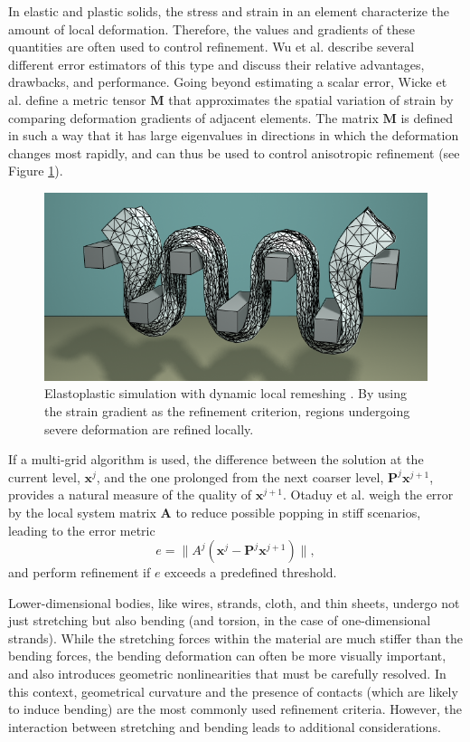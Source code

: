 In elastic and plastic solids, the stress and strain in an element characterize the amount of local deformation.
Therefore, the values and gradients of these quantities are often used to control refinement.
Wu et al. \cite{Wu2001} describe several different error estimators of this type and discuss their relative advantages, drawbacks, and performance.
Going beyond estimating a scalar error, Wicke et al. \cite{Wicke2010} define a metric tensor $\mathbf M$ that approximates the spatial variation of strain by comparing deformation gradients of adjacent elements.
The matrix $\mathbf M$ is defined in such a way that it has large eigenvalues in directions in which the deformation changes most rapidly, and can thus be used to control anisotropic refinement (see Figure \ref{fig:Wicke2010}).
\begin{figure}[!h]
  \centering
  \includegraphics[width=0.8\linewidth]{images/starAdaptivity-cgf2016/mesh-plastic.png}
  \caption[STAR adaptivity: Tetrahedral remeshing]{Elastoplastic simulation with dynamic local remeshing \cite{Wicke2010}. By using the strain gradient as the refinement criterion, regions undergoing severe deformation are refined locally.}
  \label{fig:Wicke2010}
\end{figure}

If a multi-grid algorithm is used, the difference between the solution at the current level, $\mathbf x^j$, and the one prolonged from the next coarser level, $\mathbf P^j\mathbf x^{j+1}$, provides a natural measure of the quality of $\mathbf x^{j+1}$.
Otaduy et al. \cite{Otaduy2007} weigh the error by the local system matrix $\mathbf A$ to reduce possible popping in stiff scenarios, leading to the error metric
\begin{equation}
	e = \|A^j(\mathbf x^j-\mathbf P^j\mathbf x^{j+1})\|,
\end{equation}
and perform refinement if $e$ exceeds a predefined threshold.

Lower-dimensional bodies, like wires, strands, cloth, and thin sheets, undergo not just stretching but also bending (and torsion, in the case of one-dimensional strands).
While the stretching forces within the material are much stiffer than the bending forces, the bending deformation can often be more visually important, and also introduces geometric nonlinearities that must be carefully resolved.
In this context, geometrical curvature and the presence of contacts (which are likely to induce bending) are the most commonly used refinement criteria.
However, the interaction between stretching and bending leads to additional considerations.


